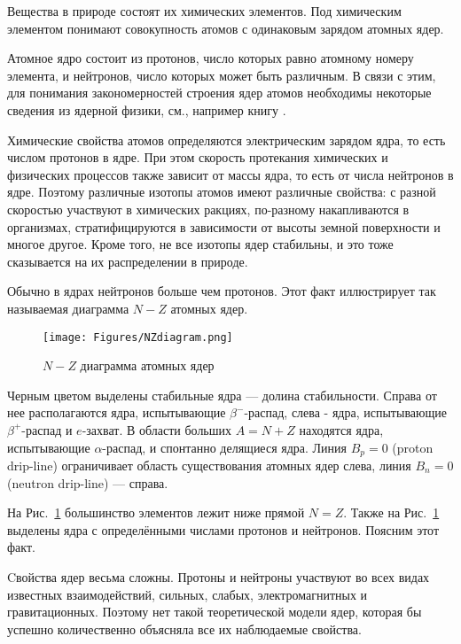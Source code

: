 \documentclass[a5paper,openany]{book}
\begin{document}
Вещества в природе состоят их химических элементов.
Под химическим элементом понимают совокупность атомов с одинаковым зарядом атомных ядер. 

Атомное ядро состоит из протонов, число которых равно атомному номеру элемента, и нейтронов, число которых может быть различным.  В связи с этим, для понимания закономерностей строения ядер атомов необходимы некоторые сведения из ядерной физики, см., например книгу \cite{NuclPhys}.

Химические свойства атомов определяются электрическим зарядом ядра, то есть числом протонов в ядре. При этом скорость протекания химических и физических процессов также зависит от массы ядра, то есть от числа нейтронов в ядре. Поэтому  различные изотопы атомов имеют различные свойства: с разной скоростью участвуют в химических ракциях, по-разному накапливаются в организмах, стратифицируются в зависимости от высоты земной поверхности и многое другое. Кроме того, не все изотопы ядер стабильны, и это тоже сказывается на их распределении в природе.

Обычно в ядрах нейтронов больше чем протонов. Этот факт иллюстрирует так называемая диаграмма $N-Z$ атомных ядер.

\begin{figure}[ht] 
	\centering\small
	\unitlength=1mm
	\texttt{[image: Figures/NZdiagram.png]} 
	\caption{$N-Z$ диаграмма  атомных ядер \cite{NuclPhys}} 
	\label{f:NZdiagram}
\end{figure}
Черным цветом выделены стабильные ядра --- долина стабильности.
Справа от нее располагаются ядра, испытывающие $\beta^{-}$-распад, слева - ядра, испытывающие $\beta^{+}$-распад и $e$-захват. В области больших $A = N+Z$ находятся ядра, испытывающие $\alpha$-распад, и спонтанно делящиеся ядра. 
Линия $B_p = 0$ (proton drip-line) ограничивает
область существования атомных ядер слева, линия $B_n = 0$ (neutron drip-line) --- справа.

На Рис.~\ref{f:NZdiagram} большинство элементов лежит ниже прямой $N=Z$.
Также на Рис.~\ref{f:NZdiagram} выделены ядра с определёнными числами протонов и нейтронов. Поясним этот факт.

Cвойства ядер весьма сложны. Протоны и нейтроны участвуют во всех видах известных взаимодействий, сильных, слабых, электромагнитных и гравитационных. Поэтому нет такой теоретической модели ядер, которая бы успешно количественно объясняла все их наблюдаемые свойства.
\end{document}
